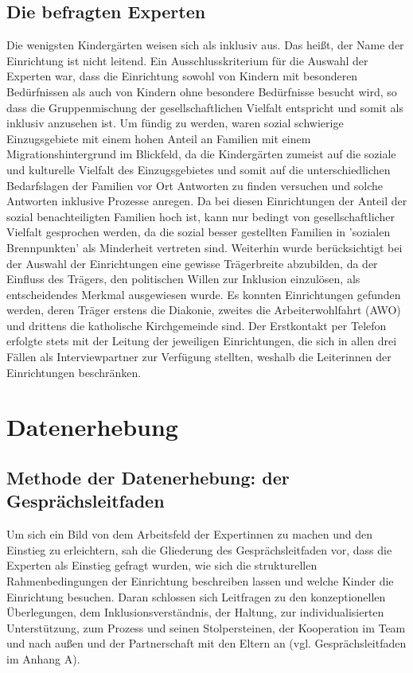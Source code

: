 \subsection{Die befragten Experten}
Die wenigsten Kindergärten weisen sich als inklusiv aus. Das heißt, der Name der Einrichtung ist nicht leitend. Ein Ausschlusskriterium für die Auswahl der Experten war, dass die Einrichtung sowohl von Kindern mit besonderen Bedürfnissen als auch von Kindern ohne besondere Bedürfnisse besucht wird, so dass die Gruppenmischung der gesellschaftlichen Vielfalt entspricht und somit als inklusiv anzusehen ist. Um fündig zu werden, waren sozial schwierige Einzugsgebiete mit einem hohen Anteil an Familien mit einem Migrationshintergrund im Blickfeld, da die Kindergärten zumeist auf die soziale und kulturelle Vielfalt des Einzugsgebietes und somit auf die unterschiedlichen Bedarfslagen der Familien vor Ort Antworten zu finden versuchen und solche Antworten inklusive Prozesse anregen. Da bei diesen Einrichtungen der Anteil der sozial benachteiligten Familien hoch ist, kann nur bedingt von gesellschaftlicher Vielfalt gesprochen werden, da die sozial besser gestellten Familien in ’sozialen Brennpunkten’ als Minderheit vertreten sind.    
Weiterhin wurde berücksichtigt bei der Auswahl der Einrichtungen eine gewisse Trägerbreite abzubilden, da der Einfluss des Trägers, den politischen Willen zur Inklusion einzulösen, als entscheidendes Merkmal ausgewiesen wurde. Es konnten Einrichtungen gefunden werden, deren Träger erstens die Diakonie, zweites die Arbeiterwohlfahrt (AWO) und drittens die katholische Kirchgemeinde sind. Der Erstkontakt per Telefon erfolgte stets mit der Leitung der jeweiligen Einrichtungen, die sich in allen drei Fällen als Interviewpartner zur Verfügung stellten, weshalb die Leiterinnen der Einrichtungen beschränken.

\section{Datenerhebung}
\subsection{Methode der Datenerhebung: der Gesprächsleitfaden}
Um sich ein Bild von dem Arbeitsfeld der Expertinnen zu machen und den Einstieg zu erleichtern, sah die Gliederung des Gesprächsleitfaden vor, dass die Experten als Einstieg gefragt wurden, wie sich die strukturellen Rahmenbedingungen der Einrichtung beschreiben lassen und welche Kinder die Einrichtung besuchen. Daran schlossen sich  Leitfragen zu den konzeptionellen Überlegungen, dem Inklusionsverständnis, der Haltung, zur individualisierten Unterstützung, zum Prozess und seinen Stolpersteinen, der Kooperation im Team und nach außen und der Partnerschaft mit den Eltern an (vgl. Gesprächsleitfaden im Anhang A).

